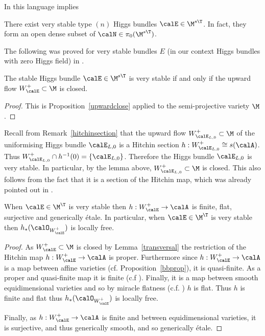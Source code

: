 In this language \cite[Proposition 3.5]{laumon} implies \begin{theorem} \label{laumon} There exist very stable type $(n)$ Higgs bundles $\calE\in \M^{s\T}$. In fact, they form an open dense subset of $\calN\in \pi_0(\M^{s\T})$.
\end{theorem}
The following was proved for very stable bundles $E$ (in our context Higgs bundles with zero Higgs field) in  \cite[Theorem 1.1]{pauly-peon-nieto}.

\begin{lemma}
\notready\label{transversal} The stable Higgs bundle $\calE\in \M^{s\T}$ is very stable if and only if the upward flow $W^+_\calE\subset\M$ is closed.
\end{lemma}

\begin{proof}This is Proposition~\ref{upwardclose} applied to the semi-projective variety $\M$.
\end{proof}

\begin{remark}
\notready \label{hsvs}
	Recall from Remark~\ref{hitchinsection} that the upward flow    $W^+_{\calE_{L,0}}\subset\M$ of the uniformising Higgs bundle $\calE_{L,0}$  is  a Hitchin section $h:W^+_{\calE_{L,0}} \cong s(\calA)$. Thus $W^+_{\calE_{L,0}}\cap h^{-1}(0)=\{\calE_{L,0}\}$. Therefore  the  Higgs bundle $\calE_{L,0}$ is very stable. In particular, by the lemma above,  $W^+_{\calE_{{L,0}}}\subset\M$ is closed. This also follows from the fact that it is a section of the Hitchin map, which  was already pointed out in \cite[p. 454]{hitchin-lie}.
\end{remark}

\begin{lemma}
\notready \label{locfree} When $\calE\in \M^{\T}$ is very stable then $h:W^+_\calE\to \calA$ is finite, flat, surjective and generically \'etale. In particular, when $\calE\in \M^{\T}$ is very stable then $h_*(\calO_{W^+_\calE})$ is locally free.
\end{lemma}
\begin{proof} As $W^+_\calE\subset \M$ is closed by Lemma~\ref{transversal} the restriction of the Hitchin map $h:W^+_\calE\to \calA$ is proper. Furthermore since $h:W^+_\calE\to \calA$ is a map between  affine varieties (cf. Proposition~\ref{bbprop}), it is quasi-finite. As a proper and quasi-finite map it is  finite (c.f \cite[Theorem 8.11.1]{ega}). Finally, it is a map between smooth equidimensional varieties and so by miracle flatness (c.f. \cite[Corollary 23.1]{matsumura}) $h$ is flat. Thus $h$ is  finite and flat  thus $h_*(\calO_{W^+_\calE})$ is locally free.

	Finally, as $h:W^+_\calE\to \calA$ is finite and between equidimensional varieties, it is surjective, and thus generically smooth, and so generically \'etale.
\end{proof}

